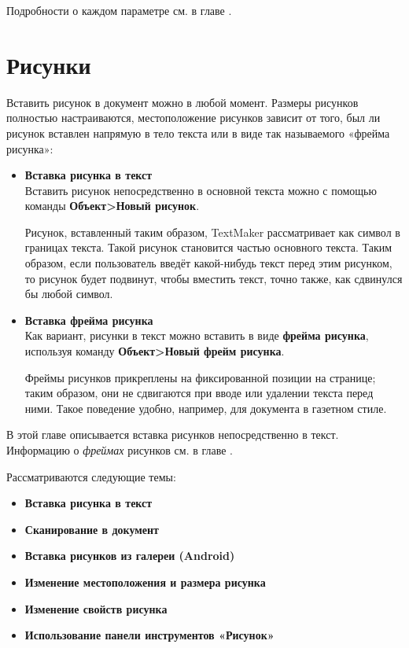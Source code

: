 ﻿\documentclass[a4paper,10pt]{article}
\begin{document}
Подробности о каждом параметре см. в главе .

\section{Рисунки} \label{sec:рисунки}
Вставить рисунок в документ можно в любой момент. Размеры рисунков полностью настраиваются, местоположение рисунков зависит от того, был ли рисунок вставлен напрямую в тело текста или в виде так называемого «фрейма рисунка»:

\begin{itemize}
 \item \textbf{Вставка рисунка в текст}\\
 Вставить рисунок непосредственно в основной текста можно с помощью команды \textbf{Объект>Новый рисунок}.
 
 Рисунок, вставленный таким образом, TextMaker рассматривает как символ в границах текста. Такой рисунок становится частью основного текста. Таким образом, если пользователь введёт какой-нибудь текст перед этим рисунком, то рисунок будет подвинут, чтобы вместить текст, точно также, как сдвинулся бы любой символ.
 \item \textbf{Вставка фрейма рисунка}\\
 Как вариант, рисунки в текст можно вставить в виде \textbf{фрейма рисунка}, используя команду \textbf{Объект>Новый фрейм рисунка}.
 
 Фреймы рисунков прикреплены на фиксированной позиции на странице; таким образом, они не сдвигаются при вводе или удалении текста перед ними. Такое поведение удобно, например, для документа в газетном стиле.
\end{itemize}

В этой главе описывается вставка рисунков непосредственно в текст. Информацию о \textit{фреймах} рисунков см. в главе .

Рассматриваются следующие темы:

\begin{itemize}
 \item \textbf{Вставка рисунка в текст}
 \item \textbf{Сканирование в документ}
 \item \textbf{Вставка рисунков из галереи (Android)}
 \item \textbf{Изменение местоположения и размера рисунка}
 \item \textbf{Изменение свойств рисунка}
 \item \textbf{Использование панели инструментов «Рисунок»}
\end{itemize}
\end{document}
